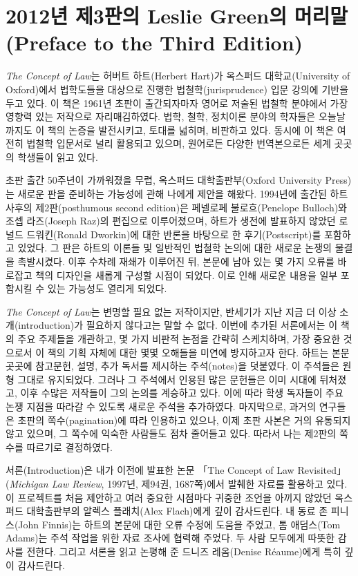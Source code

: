 \documentclass[12pt, oneside]{book}  %
\begin{document}
\newpage

\section{2012년 제3판의 Leslie Green의 머리말(Preface to the Third
Edition)}\label{uxb144-uxc81c3uxd310uxc758-leslie-greenuxc758-uxba38uxb9acuxb9d0preface-to-the-third-edition}

\emph{The Concept of Law}는 허버트 하트(Herbert Hart)가 옥스퍼드
대학교(University of Oxford)에서 법학도들을 대상으로 진행한
법철학(jurisprudence) 입문 강의에 기반을 두고 있다. 이 책은 1961년
초판이 출간되자마자 영어로 저술된 법철학 분야에서 가장 영향력 있는
저작으로 자리매김하였다. 법학, 철학, 정치이론 분야의 학자들은
오늘날까지도 이 책의 논증을 발전시키고, 토대를 넓히며, 비판하고 있다.
동시에 이 책은 여전히 법철학 입문서로 널리 활용되고 있으며, 원어로든
다양한 번역본으로든 세계 곳곳의 학생들이 읽고 있다.

초판 출간 50주년이 가까워졌을 무렵, 옥스퍼드 대학출판부(Oxford
University Press)는 새로운 판을 준비하는 가능성에 관해 나에게 제안을
해왔다. 1994년에 출간된 하트 사후의 제2판(posthumous second edition)은
페넬로페 불로흐(Penelope Bulloch)와 조셉 라즈(Joseph Raz)의 편집으로
이루어졌으며, 하트가 생전에 발표하지 않았던 로널드 드워킨(Ronald
Dworkin)에 대한 반론을 바탕으로 한 후기(Postscript)를 포함하고 있었다.
그 판은 하트의 이론들 및 일반적인 법철학 논의에 대한 새로운 논쟁의
물결을 촉발시켰다. 이후 수차례 재쇄가 이루어진 뒤, 본문에 남아 있는 몇
가지 오류를 바로잡고 책의 디자인을 새롭게 구성할 시점이 되었다. 이로
인해 새로운 내용을 일부 포함시킬 수 있는 가능성도 열리게 되었다.

\emph{The Concept of Law}는 변명할 필요 없는 저작이지만, 반세기가 지난
지금 더 이상 소개(introduction)가 필요하지 않다고는 말할 수 없다. 이번에
추가된 서론에서는 이 책의 주요 주제들을 개관하고, 몇 가지 비판적 논점을
간략히 스케치하며, 가장 중요한 것으로서 이 책의 기획 자체에 대한 몇몇
오해들을 미연에 방지하고자 한다. 하트는 본문 곳곳에 참고문헌, 설명, 추가
독서를 제시하는 주석(notes)을 덧붙였다. 이 주석들은 원형 그대로
유지되었다. 그러나 그 주석에서 인용된 많은 문헌들은 이미 시대에
뒤처졌고, 이후 수많은 저작들이 그의 논의를 계승하고 있다. 이에 따라 학생
독자들이 주요 논쟁 지점을 따라갈 수 있도록 새로운 주석을 추가하였다.
마지막으로, 과거의 연구들은 초판의 쪽수(pagination)에 따라 인용하고
있으나, 이제 초판 사본은 거의 유통되지 않고 있으며, 그 쪽수에 익숙한
사람들도 점차 줄어들고 있다. 따라서 나는 제2판의 쪽수를 따르기로
결정하였다.

서론(Introduction)은 내가 이전에 발표한 논문 「The Concept of Law
Revisited」 (\emph{Michigan Law Review}, 1997년, 제94권, 1687쪽)에서
발췌한 자료를 활용하고 있다. 이 프로젝트를 처음 제안하고 여러 중요한
시점마다 귀중한 조언을 아끼지 않았던 옥스퍼드 대학출판부의 알렉스
플래치(Alex Flach)에게 깊이 감사드린다. 내 동료 존 피니스(John Finnis)는
하트의 본문에 대한 오류 수정에 도움을 주었고, 톰 애덤스(Tom Adams)는
주석 작업을 위한 자료 조사에 협력해 주었다. 두 사람 모두에게 따뜻한
감사를 전한다. 그리고 서론을 읽고 논평해 준 드니즈 레옴(Denise
Réaume)에게 특히 깊이 감사드린다.
\end{document}
